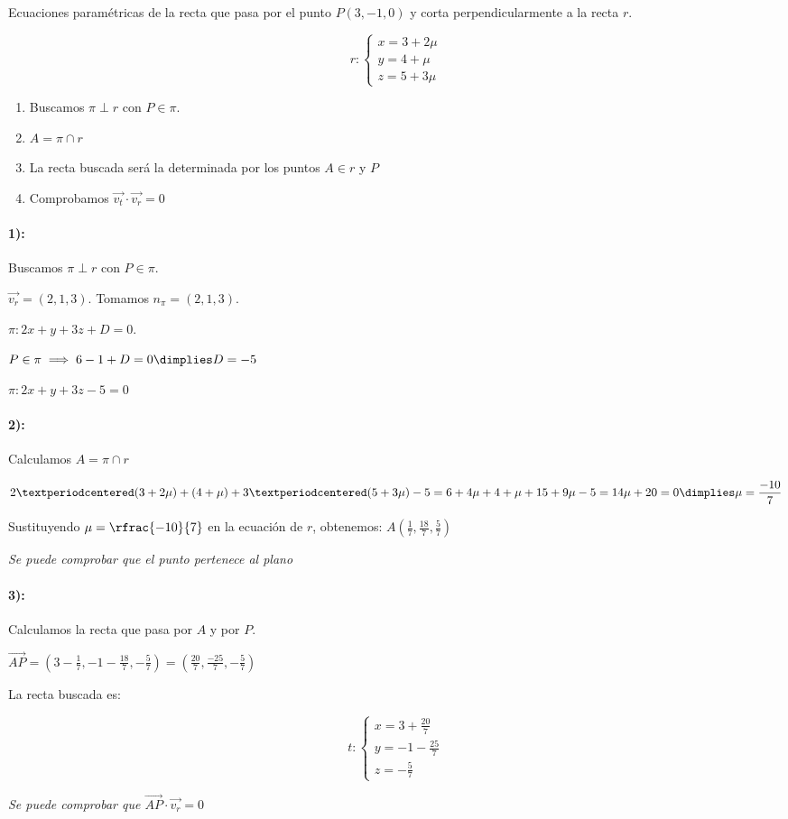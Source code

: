 \documentclass[palatino,nosec,nochap,nobuilddate]{Docencia}
\renewcommand{\vec}[1]{\overrightarrow{#1}}
\begin{document}
\begin{problem}
Ecuaciones paramétricas de la recta que pasa por el punto $P(3,-1,0)$ y corta perpendicularmente a la recta $r$.

\[
r:\begin{cases} x=3+2\mu\\y=4+\mu\\z=5+3\mu\end{cases}
\]

\solution

\begin{enumerate}
	\item Buscamos $\pi\perp r$ con $P\in\pi$.
	\item $A=\pi\cap r$
	\item La recta buscada será la determinada por los puntos $A\in r$ y $P$
	\item Comprobamos $\vec{v_t}·\vec{v_r} = 0$
\end{enumerate}

\paragraph{1):} Buscamos $\pi\perp r$ con $P\in\pi$.

$\vec{v_r} = (2,1,3)$. Tomamos $n_{\pi} = (2,1,3)$.

$\pi: 2x+y+3z+D = 0$.

$P\in\pi\implies 6-1+D=0 \dimplies D=-5$ 

$\pi:2x+y+3z-5=0$

\paragraph{2):} Calculamos $A=\pi\cap r$

\[
	2·(3+2\mu) + (4+\mu) + 3·(5+3\mu) -5 = 6+4\mu+4+\mu+15+9\mu-5 = 14\mu + 20 = 0 \dimplies \mu = \frac{-10}{7}
\]

Sustituyendo $\mu=\rfrac{-10}{7}$ en la ecuación de $r$, obtenemos: 
$A\left( \frac{1}{7},\frac{18}{7}, \frac{5}{7}\right)$

\textit{Se puede comprobar que el punto pertenece al plano}

\paragraph{3):} Calculamos la recta que pasa por $A$ y por $P$.

$\vec{AP} = \left( 3 - \frac{1}{7},-1-\frac{18}{7}, -\frac{5}{7}\right) = \left(\displaystyle\frac{20}{7},\frac{-25}{7},-\frac{5}{7}\right)$

La recta buscada es:

\[
t : \begin{cases} x = 3 + \frac{20}{7}\\y = -1 - \frac{25}{7}\\ z =-\frac{5}{7}  \end{cases}
\]

\textit{Se puede comprobar que $\vec{AP}·\vec{v_r} = 0$}
\end{problem}
\end{document}
